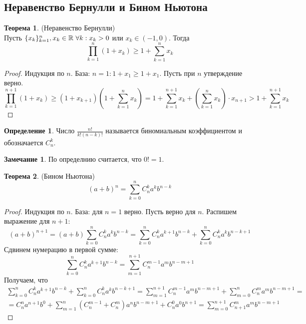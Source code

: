\documentclass[a4paper, 12pt]{article}
\newcommand{\R}{\mathbb{R}}
\newcommand\tab[1][.5cm]{\hspace*{#1}}
\theoremstyle{definition}
\newtheorem*{definition}{Определение}
\newtheorem*{theorem}{Теорема}
\newtheorem*{comm}{Замечание}
\begin{document}
        \subsection{Неравенство Бернулли и Бином Ньютона}
        \begin{theorem} (Неравенство Бернулли)\\
            Пусть $\{x_k\}_{k=1}^n, x_k\in \R \tab[3pt] \forall k: x_k>0$ или $x_k\in (-1, 0)$. Тогда
            \[\prod\limits_{k=1}^n(1+x_k)\geq 1+\sum\limits_{k=1}^nx_k\]
        \end{theorem} 
        \begin{proof}
            Индукция по $n$.
            База: $n=1: 1+x_1\geq 1+x_1$.
            Пусть при $n$ утверждение верно.
            \[\prod\limits_{k=1}^{n+1}(1+x_k)\geq(1+x_{k+1})(1+\sum\limits_{k=1}^n x_k)=1+\sum\limits_{k=1}^{n+1}x_k+(\sum\limits_{k=1}^{n}x_k)\cdot x_{n+1}> 1+\sum\limits_{k=1}^{n+1}x_k\]
        \end{proof}
        \begin{definition}
            Число $\frac{n!}{k!(n-k)!}$ называется биномиальным коэффициентом и обозначается $C_n^k$.
        \end{definition} 
        \begin{comm}
            По определнию считается, что $0!=1$.
        \end{comm} 
        \begin{theorem} (Бином Ньютона)
            \[(a+b)^n=\sum\limits_{k=0}^n C_n^k a^k b^{n-k}\]
        \end{theorem} 
        \begin{proof}
            Индукция по $n$. База: для $n=1$ верно. Пусть верно для $n$. Распишем выражение для $n+1$:
            \[(a+b)^{n+1}=(a+b)\sum\limits_{k=0}^n C_n^k a^k b^{n-k}=\sum\limits_{k=0}^n C_n^k a^{k+1} b^{n-k}+\sum\limits_{k=0}^n C_n^k a^k b^{n-k+1}\]
            Сдвинем нумерацию в первой сумме:
            \[\sum\limits_{k=0}^n C_n^k a^{k+1} b^{n-k}=\sum\limits_{m=1}^{n+1} C_n^{m-1} a^{m} b^{n-m+1}\]
            Получаем, что
            \begin{multline*}
            \sum\limits_{k=0}^n C_n^k a^{k+1} b^{n-k}+\sum\limits_{k=0}^n C_n^k a^k b^{n-k+1}=\sum\limits_{m=1}^{n+1} C_n^{m-1} a^{m} b^{n-m+1}+\sum\limits_{m=0}^n C_n^m a^m b^{n-m+1}=\\=C_n^n a^{n+1}b^0+\sum\limits_{m=1}^n(C_n^{m-1}+C_n^m)a^n b^{n-m+1}+C_n^0a^0b^{n+1}=\sum\limits_{m=0}^{n+1}C_{n+1}^m a^m b^{n-m+1}
            \end{multline*}
        \end{proof}
\end{document}
